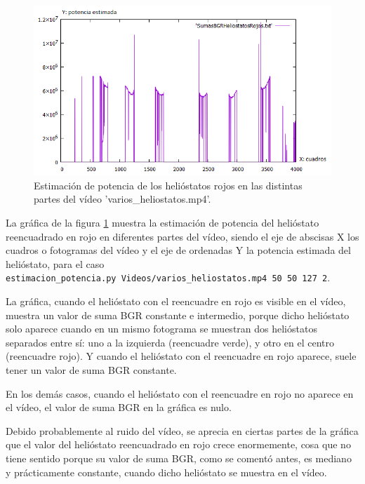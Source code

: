 \begin{figure}[h!]
  	\centering
	\includegraphics[width=\textwidth]{ValidacionCualitativaFuncionEstimacionPotencia/SumasBGRHeliostatosRojosVideo1.png}
	\caption{Estimación de potencia de los helióstatos rojos en las distintas partes del vídeo 'varios\_heliostatos.mp4'.
	\label{fig:ValidacionCualitativaFuncionEstimacionPotencia/SumasBGRHeliostatosRojosVideo1.png}}
\end{figure}

La gráfica de la figura \ref{fig:ValidacionCualitativaFuncionEstimacionPotencia/SumasBGRHeliostatosRojosVideo1.png} muestra la estimación de potencia del helióstato reencuadrado en rojo en diferentes partes del vídeo, siendo el eje de abscisas X los cuadros o fotogramas del vídeo y el eje de ordenadas Y la potencia estimada del helióstato, para el caso\\ \verb|estimacion_potencia.py Videos/varios_heliostatos.mp4 50 50 127 2|.

La gráfica, cuando el helióstato con el reencuadre en rojo es visible en el vídeo, muestra un valor de suma BGR constante e intermedio, porque dicho helióstato solo aparece cuando en un mismo fotograma se muestran dos helióstatos separados entre sí: uno a la izquierda (reencuadre verde), y otro en el centro (reencuadre rojo). Y cuando el helióstato con el reencuadre en rojo aparece, suele tener un valor de suma BGR constante.

En los demás casos, cuando el helióstato con el reencuadre en rojo no aparece en el vídeo, el valor de suma BGR en la gráfica es nulo.

Debido probablemente al ruido del vídeo, se aprecia en ciertas partes de la gráfica que el valor del helióstato reencuadrado en rojo crece enormemente, cosa que no tiene sentido porque su valor de suma BGR, como se comentó antes, es mediano y prácticamente constante, cuando dicho helióstato se muestra en el vídeo.

